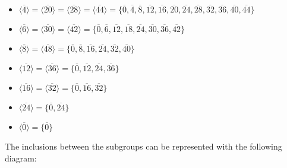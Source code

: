 \begin{solution}
\begin{itemize}
        \item $\langle\overline{4}\rangle = \langle\overline{20}\rangle
        = \langle\overline{28}\rangle = \langle\overline{44}\rangle
        = \{\overline{0}, \overline{4},
        \overline{8}, \overline{12}, \overline{16}, \overline{20},
        \overline{24}, \overline{28}, \overline{32}, \overline{36},
        \overline{40}, \overline{44}\}$

        \item $\langle\overline{6}\rangle = \langle\overline{30}\rangle
        = \langle\overline{42}\rangle = 
        \{\overline{0}, \overline{6},
        \overline{12}, \overline{18}, \overline{24}, \overline{30},
        \overline{36}, \overline{42}\}$

        \item $\langle\overline{8}\rangle = \langle\overline{48}\rangle =
        \{\overline{0}, \overline{8},
        \overline{16}, \overline{24}, \overline{32}, \overline{40}\}$

        \item $\langle\overline{12}\rangle = \langle\overline{36}\rangle
        = \{\overline{0}, \overline{12}, \overline{24}, \overline{36}\}$

        \item $\langle\overline{16}\rangle = \langle\overline{32}\rangle
        = \{\overline{0}, \overline{16}, \overline{32}\}$

        \item $\langle\overline{24}\rangle = \{\overline{0},\overline{24}\}$
        
        \item $\langle\overline{0}\rangle = \{\overline{0}\}$
    \end{itemize}

    The inclusions between the subgroups can be represented with the
    following diagram:
    \begin{center}
\end{center}
\end{solution}
